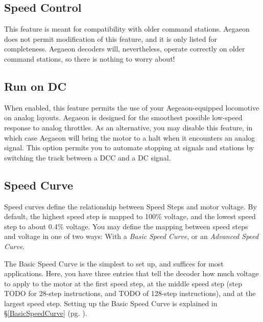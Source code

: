 \documentclass[12pt,letterpaper,draft]{memoir} %
\begin{document}
\subsection{Speed Control}
\label{CV29speedcontrol}
This feature is meant for compatibility with older command stations. Aegaeon does not permit modification of this feature, and it is only listed for completeness. Aegaeon decoders will, nevertheless, operate correctly on older command stations, so there is nothing to worry about! %

\subsection{Run on DC}
\label{CV29runondc}
When enabled, this feature permits the use of your Aegeaon-equipped locomotive on analog layouts. Aegaeon is designed for the smoothest possible low-speed response to analog throttles. As an alternative, you may disable this feature, in which case Aegaeon will bring the motor to a halt when it encounters an analog signal. This option permits you to automate stopping at signals and stations by switching the track between a DCC and a DC signal.

\subsection{Speed Curve}
\label{CV29SpeedCurve}
Speed curves define the relationship between Speed Steps and motor voltage. By default, the highest speed step is mapped to 100\% voltage, and the lowest speed step to about 0.4\% voltage. You may define the mapping between speed steps and voltage in one of two ways: With a \textit{Basic Speed Curve}, or an \textit{Advanced Speed Curve}.

The Basic Speed Curve is the simplest to set up, and suffices for most applications. Here, you have three entries that tell the decoder how much voltage to apply to the motor at the first speed step, at the middle speed step (step TODO for 28-step instructions, and TODO of 128-step instructions), and at the largest speed step. Setting up the Basic Speed Curve is explained in \S\ref{BasicSpeedCurve} (pg. \pageref{BasicSpeedCurve}).
\end{document}
